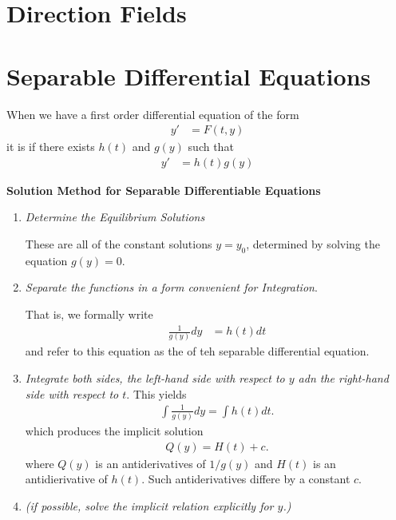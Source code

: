 \documentclass[12pt,a4paper]{report}
\begin{document}
\section{Direction Fields}

\section{Separable Differential Equations}

When we have a first order differential equation of the form 
\begin{align*}
	y' &= F(t,y)
\end{align*}it is  if there exists $h(t)$ and $g(y)$ such that
\begin{align*}
	y' &= h(t)g(y)
\end{align*}

\begin{center}
\large\textbf{Solution Method for Separable Differentiable Equations}
\end{center}

\begin{enumerate}
	\item \textit{Determine the Equilibrium Solutions}
	
	These are all of the constant solutions $y=y_0$, determined by solving the equation $g(y)=0$.
	
	\item \textit{Separate the functions in a form convenient for Integration}.
	
	That is, we formally write
	\begin{align*}
		\frac{1}{g(y)} dy &= h(t) dt
	\end{align*}and refer to this equation as the  of teh separable differential equation.
	
	\item \textit{Integrate both sides, the left-hand side with respect to $y$ adn the right-hand side with respect to $t$}.  This yields
	\begin{align*}
		\int \frac{1}{g(y)} dy = \int h(t) dt.
	\end{align*}which produces the implicit solution
	\begin{align*}
		Q(y) = H(t) + c.
	\end{align*}where $Q(y)$ is an antiderivatives of $1/g(y)$ and $H(t)$ is an antidierivative of $h(t)$.  Such antiderivatives differe by a constant $c$.
	\item \textit{(if possible, solve the implicit relation explicitly for $y$.)}
\end{enumerate}
\end{document}
